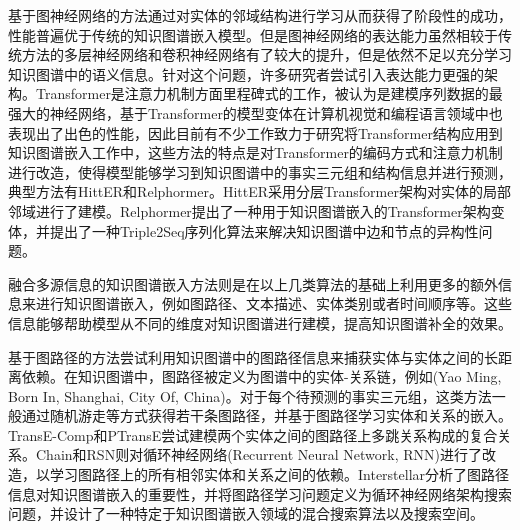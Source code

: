 基于图神经网络的方法通过对实体的邻域结构进行学习从而获得了阶段性的成功，性能普遍优于传统的知识图谱嵌入模型。但是图神经网络的表达能力虽然相较于传统方法的多层神经网络和卷积神经网络有了较大的提升，但是依然不足以充分学习知识图谱中的语义信息。针对这个问题，许多研究者尝试引入表达能力更强的架构。Transformer是注意力机制方面里程碑式的工作，被认为是建模序列数据的最强大的神经网络，基于Transformer的模型变体在计算机视觉和编程语言领域中也表现出了出色的性能，因此目前有不少工作致力于研究将Transformer结构应用到知识图谱嵌入工作中，这些方法的特点是对Transformer的编码方式和注意力机制进行改造，使得模型能够学习到知识图谱中的事实三元组和结构信息并进行预测，典型方法有HittER和Relphormer。HittER采用分层Transformer架构对实体的局部邻域进行了建模。Relphormer提出了一种用于知识图谱嵌入的Transformer架构变体，并提出了一种Triple2Seq序列化算法来解决知识图谱中边和节点的异构性问题。

融合多源信息的知识图谱嵌入方法则是在以上几类算法的基础上利用更多的额外信息来进行知识图谱嵌入，例如图路径、文本描述、实体类别或者时间顺序等。这些信息能够帮助模型从不同的维度对知识图谱进行建模，提高知识图谱补全的效果。

基于图路径的方法尝试利用知识图谱中的图路径信息来捕获实体与实体之间的长距离依赖。在知识图谱中，图路径被定义为图谱中的实体-关系链，例如(Yao Ming, Born In, Shanghai, City Of, China)。对于每个待预测的事实三元组，这类方法一般通过随机游走等方式获得若干条图路径，并基于图路径学习实体和关系的嵌入。TransE-Comp和PTransE尝试建模两个实体之间的图路径上多跳关系构成的复合关系。Chain和RSN则对循环神经网络(Recurrent Neural Network, RNN)进行了改造，以学习图路径上的所有相邻实体和关系之间的依赖。Interstellar分析了图路径信息对知识图谱嵌入的重要性，并将图路径学习问题定义为循环神经网络架构搜索问题，并设计了一种特定于知识图谱嵌入领域的混合搜索算法以及搜索空间。


